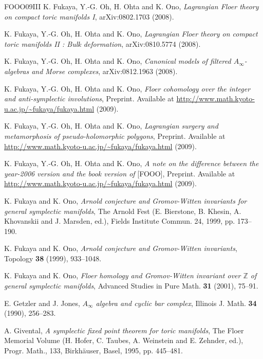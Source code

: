 \begin{thebibliography}{FOOO09III}
 K. Fukaya, Y.-G. Oh, H. Ohta and K. Ono, \emph{Lagrangian Floer theory on compact toric manifolds I}, arXiv:0802.1703 (2008).

 K. Fukaya, Y.-G. Oh, H. Ohta and K. Ono, \emph{Lagrangian Floer theory on compact toric manifolds II : Bulk deformation}, arXiv:0810.5774 (2008).

 K. Fukaya, Y.-G. Oh, H. Ohta and K. Ono, \emph{Canonical models of filtered \(A_\infty\)-algebras and Morse complexes}, arXiv:0812.1963 (2008).

 K. Fukaya, Y.-G. Oh, H. Ohta and K. Ono, \emph{Floer cohomology over the integer and anti-symplectic involutions}, Preprint. Available at \url{http://www.math.kyoto-u.ac.jp/~fukaya/fukaya.html} (2009).

 K. Fukaya, Y.-G. Oh, H. Ohta and K. Ono, \emph{Lagrangian surgery and metamorphosis of pseudo-holomorphic polygons}, Preprint. Available at \url{http://www.math.kyoto-u.ac.jp/~fukaya/fukaya.html} (2009).

 K. Fukaya, Y.-G. Oh, H. Ohta and K. Ono, \emph{A note on the difference between the year-2006 version and the book version of} [FOOO], Preprint. Available at \url{http://www.math.kyoto-u.ac.jp/~fukaya/fukaya.html} (2009).

 K. Fukaya and K. Ono, \emph{Arnold conjecture and Gromov-Witten invariants for general symplectic manifolds}, The Arnold Fest (E. Bierstone, B. Khesin, A. Khovanskii and J. Marsden, ed.), Fields Institute Commun. 24, 1999, pp. 173–190.

 K. Fukaya and K. Ono, \emph{Arnold conjecture and Gromov-Witten invariants}, Topology \textbf{38} (1999), 933–1048.

 K. Fukaya and K. Ono, \emph{Floer homology and Gromov-Witten invariant over \(\mathbb Z\) of general symplectic manifolds}, Advanced Studies in Pure Math. \textbf{31} (2001), 75–91.

 E. Getzler and J. Jones, \emph{\(A_\infty\) algebra and cyclic bar complex}, Illinois J. Math. \textbf{34} (1990), 256–283.

 A. Givental, \emph{A symplectic fixed point theorem for toric manifolds}, The Floer Memorial Volume (H. Hofer, C. Taubes, A. Weinstein and E. Zehnder, ed.), Progr. Math., 133, Birkhäuser, Basel, 1995, pp. 445–481.


\end{thebibliography}
